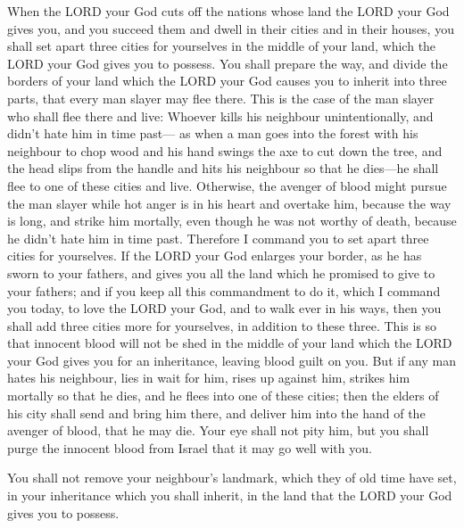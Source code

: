  When the LORD your God cuts off the nations whose land the
LORD your God gives you, and you succeed them and dwell in their cities
and in their houses,  you shall set apart three cities for
yourselves in the middle of your land, which the LORD your God gives you
to possess.  You shall prepare the way, and divide the
borders of your land which the LORD your God causes you to inherit into
three parts, that every man slayer may flee there.  This is
the case of the man slayer who shall flee there and live: Whoever kills
his neighbour unintentionally, and didn't hate him in time past---
 as when a man goes into the forest with his neighbour to
chop wood and his hand swings the axe to cut down the tree, and the head
slips from the handle and hits his neighbour so that he dies---he shall
flee to one of these cities and live.  Otherwise, the
avenger of blood might pursue the man slayer while hot anger is in his
heart and overtake him, because the way is long, and strike him
mortally, even though he was not worthy of death, because he didn't hate
him in time past.  Therefore I command you to set apart
three cities for yourselves.  If the LORD your God enlarges
your border, as he has sworn to your fathers, and gives you all the land
which he promised to give to your fathers;  and if you keep
all this commandment to do it, which I command you today, to love the
LORD your God, and to walk ever in his ways, then you shall add three
cities more for yourselves, in addition to these three. 
This is so that innocent blood will not be shed in the middle of your
land which the LORD your God gives you for an inheritance, leaving blood
guilt on you.  But if any man hates his neighbour, lies in
wait for him, rises up against him, strikes him mortally so that he
dies, and he flees into one of these cities;  then the
elders of his city shall send and bring him there, and deliver him into
the hand of the avenger of blood, that he may die.  Your
eye shall not pity him, but you shall purge the innocent blood from
Israel that it may go well with you.

 You shall not remove your neighbour's landmark, which they
of old time have set, in your inheritance which you shall inherit, in
the land that the LORD your God gives you to possess.

